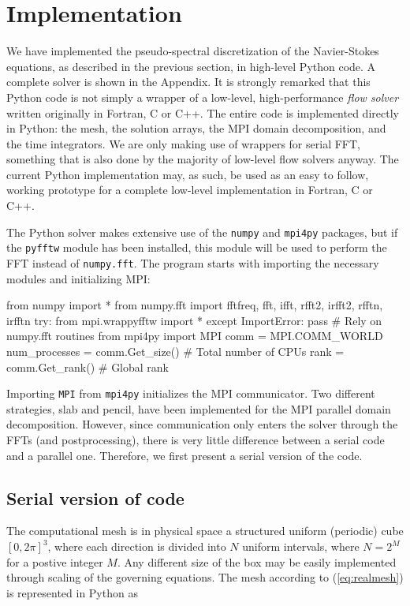 \documentclass[final,1p,times]{elsarticle}
\begin{document}
\section{Implementation}

We have implemented the pseudo-spectral discretization of the Navier-Stokes equations, as described in the previous section, in high-level Python code. A complete solver is shown in the Appendix. It is strongly remarked that this Python code is not simply a wrapper of a low-level, high-performance \emph{flow solver} written originally in Fortran, C or C++. The entire code is implemented directly in Python: the mesh, the solution arrays, the MPI domain decomposition, and the time integrators. We are only making use of wrappers for serial FFT, something that is also done by the majority of low-level flow solvers anyway. The current Python implementation may, as such, be used as an easy to follow, working prototype for a complete low-level implementation in Fortran, C or C++.

The Python solver makes extensive use of the \texttt{numpy} and \texttt{mpi4py} packages, but if the \texttt{pyfftw} module has been installed, this module will be used to perform the FFT instead of \texttt{numpy.fft}. The program starts with importing the necessary modules and initializing MPI:

\begin{python}
from numpy import *
from numpy.fft import fftfreq, fft, ifft, rfft2, irfft2, rfftn, irfftn
try:
    from mpi.wrappyfftw import *
except ImportError:
    pass # Rely on numpy.fft routines
from mpi4py import MPI
comm = MPI.COMM_WORLD
num_processes = comm.Get_size() # Total number of CPUs
rank = comm.Get_rank()          # Global rank
\end{python}
Importing \texttt{MPI} from \texttt{mpi4py} initializes the MPI communicator. Two different strategies, slab and pencil, have been implemented for the MPI parallel domain decomposition. However, since communication only enters the solver through the FFTs (and postprocessing), there is very little difference between a serial code and a parallel one. Therefore, we first present a serial version of the code.

\subsection{Serial version of code}
The computational mesh is in physical space a structured uniform (periodic) cube $[0, 2\pi]^3$, where each direction is divided into $N$ uniform intervals, where $N=2^M$ for a postive integer $M$. Any different size of the box may be easily implemented through scaling of the governing equations. The mesh according to (\ref{eq:realmesh}) is represented in Python as
\end{document}
